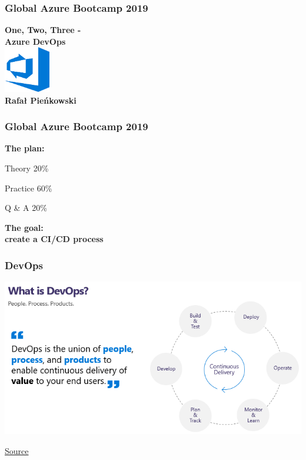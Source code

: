 \documentclass{beamer}
\def \prestitle {Global Azure Bootcamp 2019}
\newcommand{\source}[1]{
	\begin{flushright}
		\hfill {\scriptsize \href{#1}{Source}}	
	\end{flushright}
}
\begin{document}
\centering

\begin{frame}
\frametitle{\prestitle}

\textbf{{\Huge One, Two, Three -}} \\
\vspace{7mm}
\textbf{{\Huge Azure DevOps}} \\
\vspace{7mm}
\includegraphics[width=20mm]{devops.png} \\
\hfill
\textbf{
	{\large Rafał Pieńkowski}
}

\end{frame}

\begin{frame}
\frametitle{\prestitle}

\textbf{{\Large The plan:}}
\begin{center}
\begin{dinglist}{52}
	\centering
	\item Theory \hspace{31mm} 20\%
	\item Practice \hspace{29mm} 60\%
	\item Q \& A \hspace{32mm} 20\%
\end{dinglist}

\vspace{10mm}

\textbf{{\Large The goal:}} \\
\vspace{3mm}
\textbf{{\Large create a CI/CD process}}

\end{center}
\end{frame}

\begin{frame}
\frametitle{DevOps}

\includegraphics[width=\textwidth]{devopslogo.png}
\source{https://www.agileit.com/news/azure-devops-it/}	

\end{frame}
\end{document}
